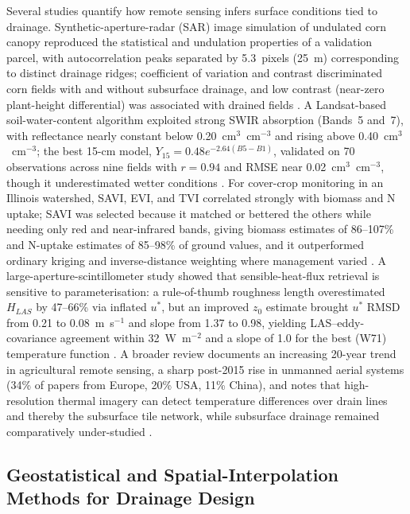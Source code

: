 \documentclass[11pt]{article}
\begin{document}
Several studies quantify how remote sensing infers surface conditions tied to
drainage. Synthetic-aperture-radar (SAR) image simulation of undulated corn
canopy reproduced the statistical and undulation properties of a validation
parcel, with autocorrelation peaks separated by 5.3~pixels (25~m) corresponding
to distinct drainage ridges; coefficient of variation and contrast discriminated
corn fields with and without subsurface drainage, and low contrast (near-zero
plant-height differential) was associated with drained fields
\parencite{Meunier2001}. A Landsat-based soil-water-content algorithm exploited
strong SWIR absorption (Bands~5 and~7), with reflectance nearly constant below
0.20~cm$^3$~cm$^{-3}$ and rising above 0.40~cm$^3$~cm$^{-3}$; the best 15-cm
model, $Y_{15}=0.48e^{-2.64(B5-B1)}$, validated on 70 observations across nine
fields with $r=0.94$ and RMSE near 0.02~cm$^3$~cm$^{-3}$, though it
underestimated wetter conditions \parencite{Rijal2013}. For cover-crop
monitoring in an Illinois watershed, SAVI, EVI, and TVI correlated strongly with
biomass and N uptake; SAVI was selected because it matched or bettered the
others while needing only red and near-infrared bands, giving biomass estimates
of 86--107\% and N-uptake estimates of 85--98\% of ground values, and it
outperformed ordinary kriging and inverse-distance weighting where management
varied \parencite{Xu2018}. A large-aperture-scintillometer study showed that
sensible-heat-flux retrieval is sensitive to parameterisation: a rule-of-thumb
roughness length overestimated $H_{LAS}$ by 47--66\% via inflated $u^*$, but an
improved $z_0$ estimate brought $u^*$ RMSD from 0.21 to 0.08~m~s$^{-1}$ and slope
from 1.37 to 0.98, yielding LAS--eddy-covariance agreement within 32~W~m$^{-2}$
and a slope of 1.0 for the best (W71) temperature function \parencite{Zhang2010}.
A broader review documents an increasing 20-year trend in agricultural remote
sensing, a sharp post-2015 rise in unmanned aerial systems (34\% of papers from
Europe, 20\% USA, 11\% China), and notes that high-resolution thermal imagery
can detect temperature differences over drain lines and thereby the subsurface
tile network, while subsurface drainage remained comparatively under-studied
\parencite{Khanal2020}.

\subsection{Geostatistical and Spatial-Interpolation Methods for Drainage Design}
\end{document}
